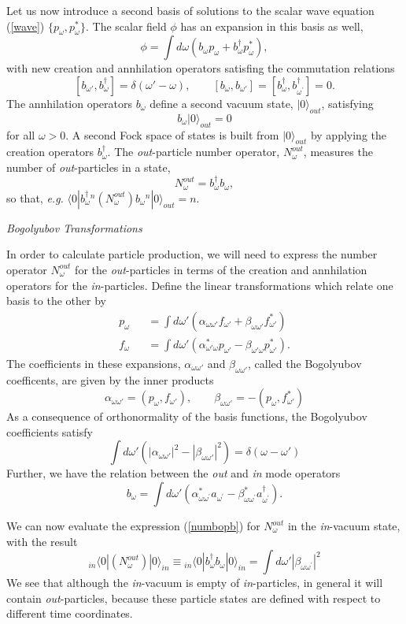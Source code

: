 \documentclass[12pt]{article}
\newcommand{\be}{\begin{equation}}
\newcommand{\ee}{\end{equation}}
\newcommand{\p}{\partial}
\def\bena{\begin{eqnarray}}
\def\eena{\end{eqnarray}}
\def\f{f_{\omega}}
\def\p{p_{\omega}}
\def\b{b_{\omega}}
\def\bd{b^{\dagger}_{\omega} }
\def\alp{\alpha _{\omega \omega '}}
\def\bet{\beta_{\omega\omega '}}
\begin{document}
Let us now introduce a second basis of solutions to the scalar wave
equation (\ref{wave})
$\{ \p,\p^*\}$.  The scalar field $\phi$ has an expansion in this basis as well,
%
\be\label{basistwo}\phi = \int d\omega (  \b \p + \b^{\dagger} \p^* ), \ee
%
with new creation and annhilation operators satisfing the commutation relations
%
\be\label{commuteb} [ b_{\omega '},\bd ] =\delta (\omega ' -\omega ),\qquad
[ b_{\omega },b_{\omega '} ]=[b^\dagger_\omega, b^\dagger_{\omega^\prime}]=0.\ee
%
The annhilation operators $\b$ define a second vacuum state, $|0\rangle_{out}$,
satisfying
%
\be\label{bvac}\b |0\rangle_{out} =0\ee
%
for all $\omega>0$.
A second Fock space of states is built from $|0\rangle_{out}$ by applying the
creation operators $\bd$. The {\it out}-particle number operator,
$N_\omega^{out}$, measures
the number of {\it out}-particles in a state,
%
\be\label{numbopb}N_{\omega}^{out} =\bd \b ,\ee
%
so that, {\it e.g.} $\langle0| \bd {}^n (N_\omega ^{out} )   \b {}^n|0\rangle_{out} = n$.

\goodbreak\vskip 0.1in\noindent
{\it Bogolyubov Transformations}
\vskip 0.05in

In order to calculate particle production,
we will need to express the number operator $N_{\omega}^{out}$ for the {\it
out}-particles
in terms of the creation and annhilation operators for the {\it in}-particles.
Define the linear transformations which relate one basis to the other  by
%
\bena\label{bogone}
\p &&= \int d\omega ' ( \alp f_{\omega '} +\bet f_{\omega '}^* )\\
\f &&=  \int d\omega ' ( \alpha_{\omega ' \omega}^* p_{\omega '} -\beta_{\omega '
\omega} p_{\omega '}^* ).\eena
%
The coefficients in these expansions, $\alp$ and $\bet $, called the Bogolyubov
coefficents, are given by the inner products
\be\label{bogtwo}\alp =(\p ,f_{\omega '} ) ,\qquad \bet =-(\p , f_{\omega
'}^* ) \ee
%
As a consequence of orthonormality of the basis functions, the Bogolyubov
coefficients satisfy
%
\be\label{bognorm} \int d\omega ' (|\alp |^2 - |\bet |^2) =
\delta (\omega -\omega ')\ee
%
Further, we have the relation between the {\it out} and {\it in} mode operators
%
\be\label{bogthree} \b =\int d\omega '\left(
\alpha_{\omega\omega^\prime}^*a_{\omega^\prime}-
\beta^*_{\omega\omega^\prime}a^\dagger_{\omega^\prime}\right).\ee
%

We can now evaluate the expression (\ref{numbopb}) for $N_{\omega}^{out}$
in the {\it
in}-vacuum state, with the result
%
\be\label{outin}{}_{in}\langle0|  (N_\omega ^{out} )   |0\rangle_{in} \equiv
{}_{in}\langle0|\bd \b |0\rangle_{in} = \int d\omega ' | \beta  _{\omega \omega^\prime
} |^2 \ee
%
We see that although the {\it in}-vacuum is empty of {\it in}-particles, in
general
it will contain {\it out}-particles, because these particle states are defined
with respect to different time coordinates.
\end{document}
